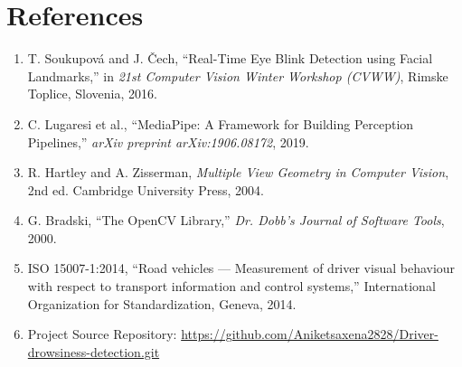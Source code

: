 \documentclass[11pt,a4paper]{article}
\begin{document}
\section{References}
\begin{enumerate}
    \item T. Soukupov\'a and J. \v{C}ech, ``Real-Time Eye Blink Detection using Facial Landmarks,'' in \textit{21st Computer Vision Winter Workshop (CVWW)}, Rimske Toplice, Slovenia, 2016.
    \item C. Lugaresi et al., ``MediaPipe: A Framework for Building Perception Pipelines,'' \textit{arXiv preprint arXiv:1906.08172}, 2019.
    \item R. Hartley and A. Zisserman, \textit{Multiple View Geometry in Computer Vision}, 2nd ed. Cambridge University Press, 2004.
    \item G. Bradski, ``The OpenCV Library,'' \textit{Dr. Dobb's Journal of Software Tools}, 2000.
    \item ISO 15007-1:2014, ``Road vehicles --- Measurement of driver visual behaviour with respect to transport information and control systems,'' International Organization for Standardization, Geneva, 2014.
    \item Project Source Repository: \url{https://github.com/Aniketsaxena2828/Driver-drowsiness-detection.git}
\end{enumerate}
\end{document}
